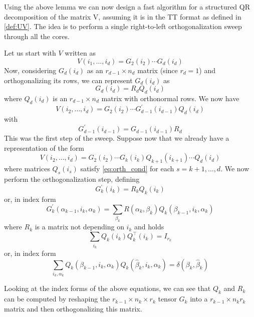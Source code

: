 Using the above lemma we can now design a fast algorithm for a structured QR decomposition of the matrix V, assuming it is in the TT format as defined in \ref{def:UV}. The idea is to perform a single right-to-left orthogonalization sweep through all the cores.

Let us start with $V$ written as
\begin{equation*}
  V(i_1,\ldots,i_d) = G_2(i_2) \cdots G_d(i_d)
\end{equation*}
Now, considering $G_d(i_d)$ as an $r_{d-1} \times n_d$ matrix (since $r_d = 1$) and orthogonalizing its rows, we can represent $G_d(i_d)$ as
\begin{equation*}
  G_d(i_d) = R_d Q_d(i_d)
\end{equation*}
where $Q_d(i_d)$ is an $r_{d-1} \times n_d$ matrix with orthonormal rows.
We now have
\begin{equation*}
  V(i_2,\ldots,i_d) = G_2(i_2) \cdots G^\prime_{d-1}(i_{d-1}) Q_d(i_d)
\end{equation*}
with
\begin{equation*}
  G^\prime_{d-1}(i_{d-1}) = G_{d-1}(i_{d-1}) R_d
\end{equation*}
This was the first step of the sweep. Suppose now that we already have a representation of the form
\begin{equation*}
  V(i_2,\ldots,i_d) = G_2(i_2) \cdots G_k(i_k) Q_{k+1}(i_{k+1}) \cdots Q_d(i_d)
\end{equation*}
where matrices $Q_s(i_s)$ satisfy \ref{eq:orth_cond} for each $s = k+1, \ldots, d$. We now perform the orthogonalization step, defining
\begin{equation*}
  G^\prime_k(i_k) = R_k Q_k(i_k)
\end{equation*}
or, in index form
\begin{equation*}
  G^\prime_k (\alpha_{k-1},i_k,\alpha_k) = \sum_{\beta_k} R(\alpha_k,\beta_k) Q_k(\beta_{k-1},i_k,\alpha_k)
\end{equation*}
where $R_k$ is a matrix not depending on $i_k$ and holds
\begin{equation*}
  \sum_{i_k} Q_k(i_k) Q_k^\top(i_k) = I_{r_k}
\end{equation*}
or, in index form
\begin{equation*}
  \sum_{i_k,\alpha_k} Q_k(\beta_{k-1},i_k,\alpha_k)Q_k(\hat{\beta}_k,i_k,\alpha_k) = \delta(\beta_k,\hat{\beta}_k)
\end{equation*}

Looking at the index forms of the above equations, we can see that $Q_k$ and $R_k$ can be computed by reshaping the $r_{k-1} \times n_k \times r_k$ tensor $G_k$ into a $r_{k-1} \times n_k r_k$ matrix and then orthogonalizing this matrix.


